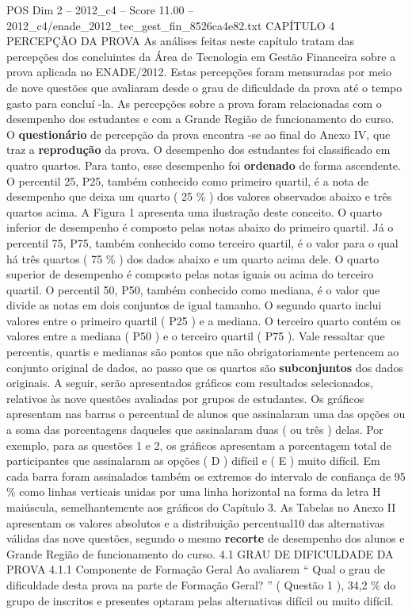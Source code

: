 \begin{textsample}{POS Dim 2 – 2012\_c4 – Score 11.00 – 2012\_c4/enade\_2012\_tec\_gest\_fin\_8526ca4e82.txt}  \label{ex:f2_pos_104}
CAPÍTULO 4 PERCEPÇÃO DA PROVA As análises feitas neste capítulo tratam das percepções dos concluintes da Área de Tecnologia em Gestão Financeira sobre a prova aplicada no ENADE/2012.
Estas percepções foram mensuradas por meio de nove questões que avaliaram desde o grau de dificuldade da prova até o tempo gasto para concluí -la.
As percepções sobre a prova foram relacionadas com o desempenho dos estudantes e com a Grande Região de funcionamento do curso.
O \textbf{questionário} de percepção da prova encontra -se ao final do Anexo IV, que traz a \textbf{reprodução} da prova.
O desempenho dos estudantes foi classificado em quatro quartos.
Para tanto, esse desempenho foi \textbf{ordenado} de forma ascendente.
O percentil 25, P25, também conhecido como primeiro quartil, é a nota de desempenho que deixa um quarto ( 25 \% ) dos valores observados abaixo e três quartos acima.
A Figura 1 apresenta uma ilustração deste conceito.
O quarto inferior de desempenho é composto pelas notas abaixo do primeiro quartil.
Já o percentil 75, P75, também conhecido como terceiro quartil, é o valor para o qual há três quartos ( 75 \% ) dos dados abaixo e um quarto acima dele.
O quarto superior de desempenho é composto pelas notas iguais ou acima do terceiro quartil.
O percentil 50, P50, também conhecido como mediana, é o valor que divide as notas em dois conjuntos de igual tamanho.
O segundo quarto inclui valores entre o primeiro quartil ( P25 ) e a mediana.
O terceiro quarto contém os valores entre a mediana ( P50 ) e o terceiro quartil ( P75 ).
Vale ressaltar que percentis, quartis e medianas são pontos que não obrigatoriamente pertencem ao conjunto original de dados, ao passo que os quartos são \textbf{subconjuntos} dos dados originais.
A seguir, serão apresentados gráficos com resultados selecionados, relativos às nove questões avaliadas por grupos de estudantes.
Os gráficos apresentam nas barras o percentual de alunos que assinalaram uma das opções ou a soma das porcentagens daqueles que assinalaram duas ( ou três ) delas.
Por exemplo, para as questões 1 e 2, os gráficos apresentam a porcentagem total de participantes que assinalaram as opções ( D ) difícil e ( E ) muito difícil.
Em cada barra foram assinalados também os extremos do intervalo de confiança de 95 \% como linhas verticais unidas por uma linha horizontal na forma da letra H maiúscula, semelhantemente aos gráficos do Capítulo 3.
As Tabelas no Anexo II apresentam os valores absolutos e a distribuição percentual10 das alternativas válidas das nove questões, segundo o mesmo \textbf{recorte} de desempenho dos alunos e Grande Região de funcionamento do curso. 4.1 GRAU DE DIFICULDADE DA PROVA 4.1.1 Componente de Formação Geral Ao avaliarem “ Qual o grau de dificuldade desta prova na parte de Formação Geral? ” ( Questão 1 ), 34,2 \% do grupo de inscritos e presentes optaram pelas alternativas difícil ou muito difícil.

\end{textsample}
